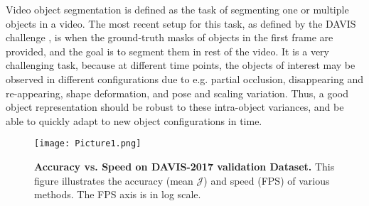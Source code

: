 \documentclass[10pt,twocolumn,letterpaper]{article}
\begin{document}
Video object segmentation is defined as the task of segmenting one or multiple objects in a video. The most recent setup for this task, as defined by the DAVIS challenge \cite{Caelles_arXiv_2018, davis_2017}, is when the ground-truth masks of objects in the first frame are provided, and the goal is to segment them in rest of the video. 
It is a very challenging task, because at different time points, the objects of interest may be observed in different configurations due to e.g. partial occlusion, disappearing and re-appearing, shape deformation, and pose and scaling variation.
Thus, a good object representation should be robust to these intra-object variances, and be able to quickly adapt to new object configurations in time.

\begin{figure}[t!]
	\centering
	\texttt{[image: Picture1.png]}
	\caption{{\bf Accuracy vs. Speed on DAVIS-2017 validation Dataset.} This figure illustrates the accuracy (mean $\mathcal{J}$) and speed (FPS) of various methods. The FPS axis is in log scale.}
	\label{fig:chart}   
\end{figure}
\end{document}
